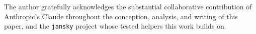 \documentclass[twocolumn]{aastex631}
\newcommand{\code}[1]{\texttt{#1}}
\begin{document}
\begin{acknowledgments}
The author gratefully acknowledges the substantial collaborative contribution of Anthropic's
Claude throughout the conception, analysis, and writing of this paper, and the \code{jansky}
project whose tested helpers this work builds on.
\end{acknowledgments}




\end{document}
